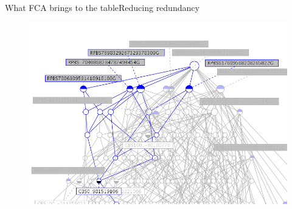 \begin{frame}{What FCA brings to the table}{Reducing redundancy}
  \begin{figure}[ht]
    \begin{minipage}[t]{0.8\linewidth}
      \vspace{0pt}
      \centering
      \includegraphics[width=\textwidth]{img/fca/common_part}
    \end{minipage}
    \hfill
    \begin{minipage}[t]{0\linewidth}
    \end{minipage}
  \end{figure}
\end{frame}
